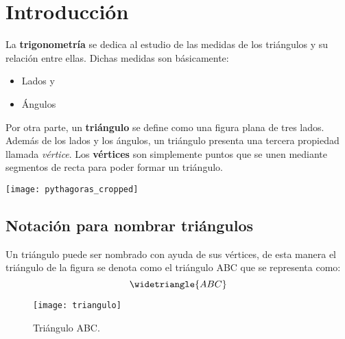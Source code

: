 \section{Introducción}
La \textbf{trigonometría} se dedica al estudio de las medidas de los triángulos 
y su relación entre ellas.
Dichas medidas son básicamente:
\begin{itemize}
  \item Lados y
  \item Ángulos
\end{itemize}

Por otra parte, un \textbf{triángulo} se define como una figura plana de tres 
lados. Además de los lados y los ángulos, un triángulo presenta una tercera 
propiedad llamada \textit{vértice}.
Los \textbf{vértices} son simplemente puntos que se unen mediante segmentos de recta para
poder formar un triángulo.

\begin{marginfigure}[-3.5cm]
	\texttt{[image: pythagoras\_cropped]}
	\caption[pythagoras]{Pitágoras. Filósofo y matemático griego distinguido por 
    sus aportaciones a la artimética, geometría y trigonometría.
  }
\end{marginfigure}

\subsection{Notación para nombrar triángulos}

Un triángulo puede ser nombrado con ayuda de sus vértices, de esta manera el 
triángulo de la figura  se denota como el triángulo ABC que se 
representa como:
$$\widetriangle{ABC}$$

\begin{figure}[hb]
	\texttt{[image: triangulo]}
	\caption[Triangulo]{Triángulo ABC. }
\end{figure}

